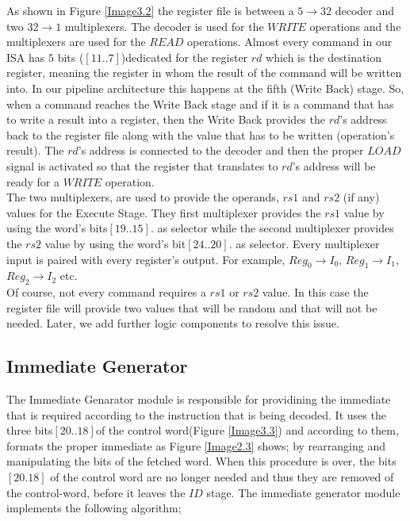 	As shown in Figure \ref{Image3.2} the register file is between a $5\rightarrow32$ decoder and two $32\rightarrow1$ multiplexers.
	The decoder is used for the $WRITE$ operations and the multiplexers are used for the $READ$ operations. Almost every command in our ISA has $5$ bits ($[11..7]$)\footnotemark dedicated for the register $rd$ which is the destination register, meaning the register in whom the result of the command will be written into. In our pipeline architecture this happens at the fifth (Write Back) stage. So, when a command reaches the Write Back stage and if it is a command that has to write a result into a register, then the Write Back provides the $rd$'s address back to the register file along with the value that has to be written (operation's result). The $rd$'s address is connected to the decoder and then the proper $LOAD$ signal is activated so that the register that translates to $rd$'s address will be ready for a $WRITE$ operation.\\
	
	The two multiplexers, are used to provide the operands, $rs1$ and $rs2$ (if any) values for the Execute Stage. They first multiplexer provides the $rs1$ value by using the word's bits$[19..15]$\footnotemark[\value{footnote}]. as selector while the second multiplexer provides the $rs2$ value by using the word's bit$[24..20]$\footnotemark[\value{footnote}]. as selector. Every multiplexer input is paired with every register's output. For example, $Reg_0\rightarrow I_0$, $Reg_1 \rightarrow I_1$, $Reg_2 \rightarrow I_2$ etc. \\
	
	Of course, not every command requires a $rs1$ or $rs2$ value. In this case the register file will provide two values that will be random and that will not be needed. Later, we add further logic components to resolve this issue. 
	
	
	
\vspace{5mm}
\subsection{\textcolor{burgundy}{Immediate Generator}}
\label{SubSec3.2.4:IMMGEN}
The Immediate Genarator module is responsible for providining the immediate that is required according to the instruction that is being decoded. It uses the three bits$[20..18]$of the control word(Figure \ref{Image3.3})  and according to them, formats the proper immediate as Figure \ref{Image2.3} shows; by rearranging and manipulating the bits of the fetched word. When this procedure is over, the bits$[20.18]$ of the control word are no longer needed and thus they are removed of the control-word, before it leaves the $ID$ stage. The immediate generator module implements the following algorithm;

